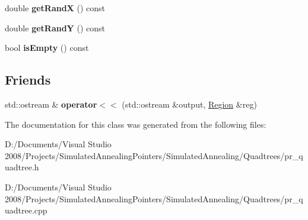 \begin{DoxyCompactItemize}
\item 
\hypertarget{class_region_ab6c22c7f638b9a2cfc1f50f39ab676e3}{
double {\bfseries getRandX} () const }
\label{class_region_ab6c22c7f638b9a2cfc1f50f39ab676e3}

\item 
\hypertarget{class_region_a51db17215e93928471317a10ac943465}{
double {\bfseries getRandY} () const }
\label{class_region_a51db17215e93928471317a10ac943465}

\item 
\hypertarget{class_region_acb7d006debd4a0fb2e7717b0abb542df}{
bool {\bfseries isEmpty} () const }
\label{class_region_acb7d006debd4a0fb2e7717b0abb542df}

\end{DoxyCompactItemize}
\subsection*{Friends}
\begin{DoxyCompactItemize}
\item 
\hypertarget{class_region_a9ec3bd288edf17557308dc30e39a1e36}{
std::ostream \& {\bfseries operator$<$$<$} (std::ostream \&output, \hyperlink{class_region}{Region} \&reg)}
\label{class_region_a9ec3bd288edf17557308dc30e39a1e36}

\end{DoxyCompactItemize}


The documentation for this class was generated from the following files:\begin{DoxyCompactItemize}
\item 
D:/Documents/Visual Studio 2008/Projects/SimulatedAnnealingPointers/SimulatedAnnealing/Quadtrees/pr\_\-quadtree.h\item 
D:/Documents/Visual Studio 2008/Projects/SimulatedAnnealingPointers/SimulatedAnnealing/Quadtrees/pr\_\-quadtree.cpp\end{DoxyCompactItemize}
